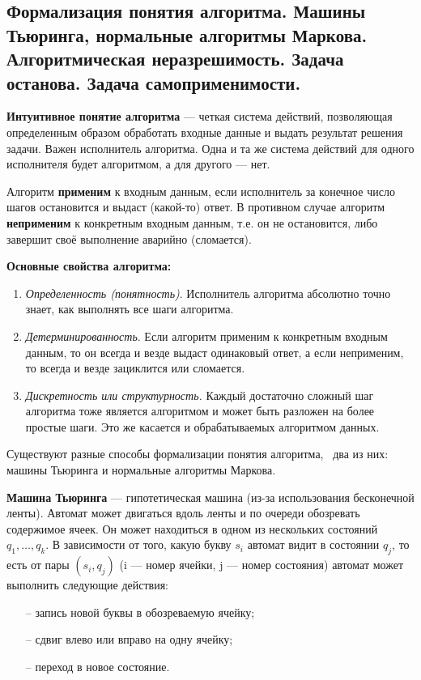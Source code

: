 \subsection{Формализация понятия алгоритма. Машины Тьюринга, нормальные алгоритмы Маркова. Алгоритмическая неразрешимость. Задача останова. Задача самоприменимости.}


\textbf{Интуитивное понятие алгоритма} --- четкая система действий, позволяющая определенным образом обработать входные данные и выдать результат решения задачи. Важен исполнитель алгоритма. Одна и та же система действий для одного исполнителя будет алгоритмом, а для другого --- нет.

Алгоритм \textbf{применим} к входным данным, если исполнитель за конечное число шагов остановится и выдаст (какой-то) ответ. В противном случае алгоритм \textbf{неприменим} к конкретным входным данным, т.е. он не остановится, либо завершит своё выполнение аварийно (сломается).

\textbf{Основные свойства алгоритма:}
\begin{enumerate}
    \item\textit{Определенность (понятность)}. Исполнитель алгоритма абсолютно точно знает, как выполнять все шаги алгоритма.
    \item \textit{Детерминированность}. Если алгоритм применим к конкретным входным данным, то он всегда и везде выдаст одинаковый ответ, а если неприменим, то всегда и везде зациклится или сломается.
    \item \textit{Дискретность или структурность.} Каждый достаточно сложный шаг алгоритма тоже является алгоритмом и может быть разложен на более простые шаги. Это же касается и обрабатываемых алгоритмом данных.
\end{enumerate}

Существуют разные способы формализации понятия алгоритма, \faEye \ два из них: машины Тьюринга и нормальные алгоритмы Маркова.


\textbf{Машина Тьюринга} --- гипотетическая машина (из-за использования бесконечной ленты). Автомат может двигаться вдоль ленты и по очереди обозревать содержимое ячеек. Он может находиться в одном из нескольких состояний $q_1,\dots, q_k$. В зависимости от того, какую букву $s_i$ автомат видит в состоянии $q_j$, то есть от пары $(s_i,q_j)$ (i --- номер ячейки, j --- номер состояния) автомат может выполнить следующие действия:
\begin{itemize}
    \item[--] запись новой буквы в обозреваемую ячейку; 
    \item[--] сдвиг влево или вправо на одну ячейку;
    \item[--] переход в новое состояние.
\end{itemize}


